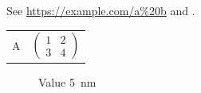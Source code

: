 \documentclass{article}
\begin{document}
See \url{https://example.com/a%20b} and \cite[see][p.~2]{schr2020,missing2021}.
\begin{tabular}{ll} A & $\begin{pmatrix}1 & 2 \\ 3 & 4\end{pmatrix}$ \\ \end{tabular}
\begin{figure}\caption{Value \SI{5}{nm}}\end{figure}


\end{document}
